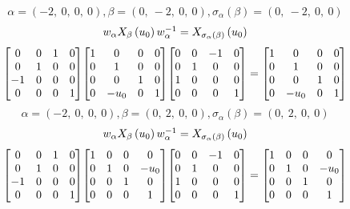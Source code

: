 \documentclass[11pt]{article}
\theoremstyle{definition}
\begin{document}
\[
\alpha = \left( -2, \  0, \  0, \  0\right), \beta = \left( 0, \  -2, \  0, \  0\right), \sigma_{\alpha}(\beta) = \left( 0, \  -2, \  0, \  0\right)
\]
\[
\scaletoalign{\textwidth}{w_{\alpha} X_{\beta}\left(u_{0}\right) w_{\alpha}^{-1} = X_{\sigma_{\alpha}\left(\beta\right)}\left(u_{0}\right)}
\]
\[
\scaletoalign{\textwidth}{{\left[\begin{matrix}0 & 0 & 1 & 0\\0 & 1 & 0 & 0\\-1 & 0 & 0 & 0\\0 & 0 & 0 & 1\end{matrix}\right]} {\left[\begin{matrix}1 & 0 & 0 & 0\\0 & 1 & 0 & 0\\0 & 0 & 1 & 0\\0 & - u_{0} & 0 & 1\end{matrix}\right]} {\left[\begin{matrix}0 & 0 & -1 & 0\\0 & 1 & 0 & 0\\1 & 0 & 0 & 0\\0 & 0 & 0 & 1\end{matrix}\right]} = {\left[\begin{matrix}1 & 0 & 0 & 0\\0 & 1 & 0 & 0\\0 & 0 & 1 & 0\\0 & - u_{0} & 0 & 1\end{matrix}\right]}}
\]
\[
\alpha = \left( -2, \  0, \  0, \  0\right), \beta = \left( 0, \  2, \  0, \  0\right), \sigma_{\alpha}(\beta) = \left( 0, \  2, \  0, \  0\right)
\]
\[
\scaletoalign{\textwidth}{w_{\alpha} X_{\beta}\left(u_{0}\right) w_{\alpha}^{-1} = X_{\sigma_{\alpha}\left(\beta\right)}\left(u_{0}\right)}
\]
\[
\scaletoalign{\textwidth}{{\left[\begin{matrix}0 & 0 & 1 & 0\\0 & 1 & 0 & 0\\-1 & 0 & 0 & 0\\0 & 0 & 0 & 1\end{matrix}\right]} {\left[\begin{matrix}1 & 0 & 0 & 0\\0 & 1 & 0 & - u_{0}\\0 & 0 & 1 & 0\\0 & 0 & 0 & 1\end{matrix}\right]} {\left[\begin{matrix}0 & 0 & -1 & 0\\0 & 1 & 0 & 0\\1 & 0 & 0 & 0\\0 & 0 & 0 & 1\end{matrix}\right]} = {\left[\begin{matrix}1 & 0 & 0 & 0\\0 & 1 & 0 & - u_{0}\\0 & 0 & 1 & 0\\0 & 0 & 0 & 1\end{matrix}\right]}}
\]
\end{document}
